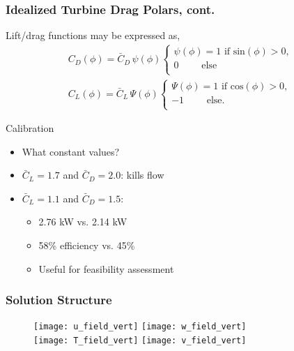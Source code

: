 \documentclass[mathserif]{beamer}
\begin{document}
%
%
\begin{frame}
 \frametitle{Idealized Turbine Drag Polars, cont.}

Lift/drag functions may be expressed as,
 \begin{align*} 
 C_D(\phi) = \bar C_D \, \psi(\phi) 
  \begin{cases}
   \psi(\phi) = 1 \text{ if sin}(\phi) > 0,   \\
   0 \quad\quad\text{    else} \\
  \end{cases} \\
 C_L(\phi) = \bar C_L \, \Psi(\phi) 
  \begin{cases}
   \Psi(\phi) = 1 \text{ if cos}(\phi) > 0,   \\
   -1 \quad\quad\text{ else}. \\
  \end{cases}
\end{align*}

 \begin{block}{Calibration}
   \begin{itemize}
   \item What constant values?
   \item $\bar C_L = 1.7$ and $\bar C_D = 2.0$: kills flow
   \item $\bar C_L = 1.1$ and $\bar C_D = 1.5$: 
     \begin{itemize}
     \item 2.76 kW vs. 2.14 kW 
     \item 58\% efficiency vs. 45\%
     \item Useful for feasibility assessment
     \end{itemize}
   \end{itemize}
 \end{block}
\end{frame}


%
%
\begin{frame}
 \frametitle{Solution Structure}


\begin{figure}[!htb]
  \centering
  \texttt{[image: u\_field\_vert]}
  \hfill
  \texttt{[image: w\_field\_vert]}
  \\
  \texttt{[image: T\_field\_vert]}
  \hfill
  \texttt{[image: v\_field\_vert]}
\end{figure}

\end{frame}
\end{document}
